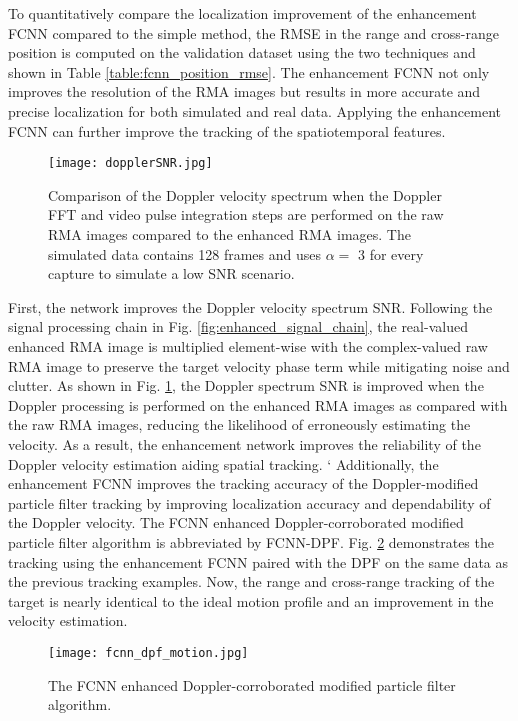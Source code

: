 \documentclass[10pt,journal,final]{IEEEtran}
\begin{document}
To quantitatively compare the localization improvement of the enhancement FCNN compared to the simple method, the RMSE in the range and cross-range position is computed on the validation dataset using the two techniques and shown in Table \ref{table:fcnn_position_rmse}. The enhancement FCNN not only improves the resolution of the RMA images but results in more accurate and precise localization for both simulated and real data. Applying the enhancement FCNN can further improve the tracking of the spatiotemporal features.

\begin{figure}[h]
	\centering
	\texttt{[image: dopplerSNR.jpg]}
	\caption{Comparison of the Doppler velocity spectrum when the Doppler FFT and video pulse integration steps are performed on the raw RMA images compared to the enhanced RMA images. The simulated data contains 128 frames and uses $\alpha = $ 3 for every capture to simulate a low SNR scenario.}
	\label{fig:doppler_snr}
\end{figure}

First, the network improves the Doppler velocity spectrum SNR. Following the signal processing chain in Fig. \ref{fig:enhanced_signal_chain}, the real-valued enhanced RMA image is multiplied element-wise with the complex-valued raw RMA image to preserve the target velocity phase term while mitigating noise and clutter. As shown in Fig. \ref{fig:doppler_snr}, the Doppler spectrum SNR is improved when the Doppler processing is performed on the enhanced RMA images as compared with the raw RMA images, reducing the likelihood of erroneously estimating the velocity. As a result, the enhancement network improves the reliability of the Doppler velocity estimation aiding spatial tracking.
`
Additionally, the enhancement FCNN improves the tracking accuracy of the Doppler-modified particle filter tracking by improving localization accuracy and dependability of the Doppler velocity. The FCNN enhanced Doppler-corroborated modified particle filter algorithm is abbreviated by FCNN-DPF. Fig. \ref{fig:fcnn_dpf_motion} demonstrates the tracking using the enhancement FCNN paired with the DPF on the same data as the previous tracking examples. Now, the range and cross-range tracking of the target is nearly identical to the ideal motion profile and an improvement in the velocity estimation.

\begin{figure}[h]
	\centering
	\texttt{[image: fcnn\_dpf\_motion.jpg]}
	\caption{The FCNN enhanced Doppler-corroborated modified particle filter algorithm.}
	\label{fig:fcnn_dpf_motion}
\end{figure}
\end{document}
